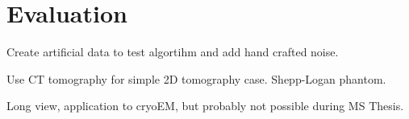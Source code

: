 \chapter{Evaluation}
\label{sec:evaluation}


Create artificial data to test algortihm
and add hand crafted noise.

Use CT tomography for simple 2D tomography case.
Shepp-Logan phantom.

Long view, application to cryoEM, 
but probably not possible during MS Thesis.